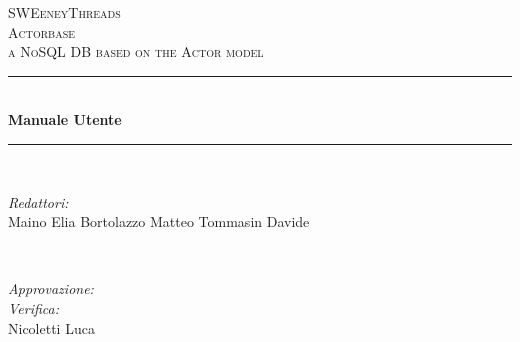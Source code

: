 \documentclass[a4paper]{article}
\begin{document}
	
	\begin{titlepage}
		\newcommand{\HRule}{\rule{\linewidth}{0.5mm}} 
		\center  
		
		\textsc{\LARGE SWEeneyThreads}\\[1.5cm] 
		\textsc{\Large Actorbase}\\[0.5cm] 
		\textsc{\large a NoSQL DB based on the Actor model}\\[0.5cm]
		
		
		\HRule \\[0.4cm]
		{ \huge \bfseries Manuale Utente}\\[0.4cm] 
		\HRule \\[1.5cm]
		
		\begin{minipage}{0.4\textwidth}
			\begin{flushleft} \large
				\emph{Redattori:}\\
				Maino Elia \newline
				Bortolazzo Matteo \newline
				Tommasin Davide \\
			\end{flushleft}
		\end{minipage}
		~
		\begin{minipage}{0.4\textwidth}
			\begin{flushright} \large
				\emph{Approvazione:} \\
				\emph{Verifica:} \\
				Nicoletti Luca
			\end{flushright}
		\end{minipage}
		

\end{titlepage}
\end{document}
